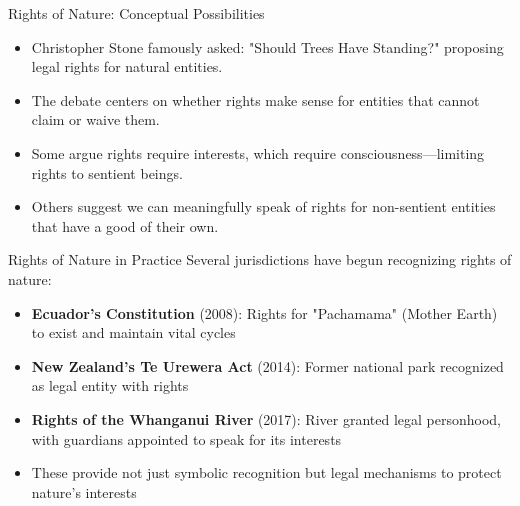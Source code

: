 \documentclass{beamer}
\begin{document}
	\begin{frame}{Rights of Nature: Conceptual Possibilities}
		\begin{itemize}
			\item Christopher Stone famously asked: "Should Trees Have Standing?" proposing legal rights for natural entities.
			\item The debate centers on whether rights make sense for entities that cannot claim or waive them.
			\item Some argue rights require interests, which require consciousness—limiting rights to sentient beings.
			\item Others suggest we can meaningfully speak of rights for non-sentient entities that have a good of their own.
		\end{itemize}
		
		\begin{block}{Rights of Nature in Practice}
			\scriptsize
			Several jurisdictions have begun recognizing rights of nature:
			\begin{itemize}
				\item \textbf{Ecuador's Constitution} (2008): Rights for "Pachamama" (Mother Earth) to exist and maintain vital cycles
				\item \textbf{New Zealand's Te Urewera Act} (2014): Former national park recognized as legal entity with rights
				\item \textbf{Rights of the Whanganui River} (2017): River granted legal personhood, with guardians appointed to speak for its interests
				\item These provide not just symbolic recognition but legal mechanisms to protect nature's interests
			\end{itemize}
		\end{block}
	\end{frame}
	
\end{document}
